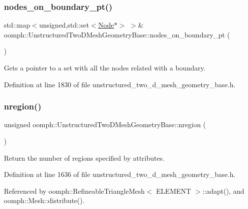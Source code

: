 \subsubsection{\texorpdfstring{nodes\+\_\+on\+\_\+boundary\+\_\+pt()}{nodes\_on\_boundary\_pt()}}
{\footnotesize\ttfamily std\+::map$<$unsigned,std\+::set$<$\hyperlink{classoomph_1_1Node}{Node}$\ast$$>$ $>$\& oomph\+::\+Unstructured\+Two\+D\+Mesh\+Geometry\+Base\+::nodes\+\_\+on\+\_\+boundary\+\_\+pt (\begin{DoxyParamCaption}{ }\end{DoxyParamCaption})\hspace{0.3cm}{\ttfamily [inline]}}



Gets a pointer to a set with all the nodes related with a boundary. 



Definition at line 1830 of file unstructured\+\_\+two\+\_\+d\+\_\+mesh\+\_\+geometry\+\_\+base.\+h.

\mbox{\label{classoomph_1_1UnstructuredTwoDMeshGeometryBase_a9776e5d11ad42ce4d49750d31a87e1fc}} 
\subsubsection{\texorpdfstring{nregion()}{nregion()}}
{\footnotesize\ttfamily unsigned oomph\+::\+Unstructured\+Two\+D\+Mesh\+Geometry\+Base\+::nregion (\begin{DoxyParamCaption}{ }\end{DoxyParamCaption})\hspace{0.3cm}{\ttfamily [inline]}}



Return the number of regions specified by attributes. 



Definition at line 1636 of file unstructured\+\_\+two\+\_\+d\+\_\+mesh\+\_\+geometry\+\_\+base.\+h.



Referenced by oomph\+::\+Refineable\+Triangle\+Mesh$<$ E\+L\+E\+M\+E\+N\+T $>$\+::adapt(), and oomph\+::\+Mesh\+::distribute().

